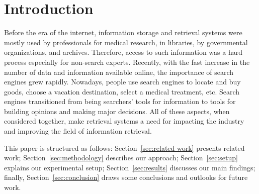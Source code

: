 \section{Introduction}
\label{sec:introduction}

Before the era of the internet, information storage and retrieval systems were mostly
used by professionals for medical research, in libraries, by governmental
organizations, and archives. Therefore, access to such information was a hard process especially
for non-search experts. Recently, with the fast increase in the number of data and information
available online, the importance of search engines grew rapidly. Nowadays, people use
search engines to locate and buy goods, choose a vacation destination, select
a medical treatment, etc. Search engines
transitioned from being searchers' tools for information to tools for building opinions and making
major decisions. All of these aspects, when considered together, make retrieval systems a need for impacting
the industry and improving the field of information retrieval.


This paper is structured as follows: Section~\ref{sec:related work} presents related work; Section~\ref{sec:methodology} describes our approach; Section~\ref{sec:setup} explains our experimental setup; Section~\ref{sec:results} discusses our main findings; finally, Section~\ref{sec:conclusion} draws some conclusions and outlooks for future work.